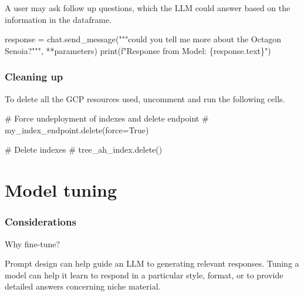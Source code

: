 \documentclass[
  letterpaper,
  DIV=11,
  numbers=noendperiod]{scrreprt}
\newenvironment{Shaded}{\begin{snugshade}}{\end{snugshade}}
\newcommand{\BuiltInTok}[1]{\textcolor[rgb]{0.00,0.23,0.31}{#1}}
\newcommand{\CommentTok}[1]{\textcolor[rgb]{0.37,0.37,0.37}{#1}}
\newcommand{\NormalTok}[1]{\textcolor[rgb]{0.00,0.23,0.31}{#1}}
\newcommand{\OperatorTok}[1]{\textcolor[rgb]{0.37,0.37,0.37}{#1}}
\newcommand{\SpecialCharTok}[1]{\textcolor[rgb]{0.37,0.37,0.37}{#1}}
\newcommand{\SpecialStringTok}[1]{\textcolor[rgb]{0.13,0.47,0.30}{#1}}
\newcommand{\StringTok}[1]{\textcolor[rgb]{0.13,0.47,0.30}{#1}}
\begin{document}
A user may ask follow up questions, which the LLM could answer based on
the information in the dataframe.

\begin{Shaded}
\begin{Highlighting}[]
\NormalTok{response }\OperatorTok{=}\NormalTok{ chat.send\_message(}\StringTok{"""could you tell me more about the Octagon Senoia?"""}\NormalTok{, }\OperatorTok{**}\NormalTok{parameters)}
\BuiltInTok{print}\NormalTok{(}\SpecialStringTok{f"Response from Model: }\SpecialCharTok{\{}\NormalTok{response}\SpecialCharTok{.}\NormalTok{text}\SpecialCharTok{\}}\SpecialStringTok{"}\NormalTok{)}
\end{Highlighting}
\end{Shaded}

\hypertarget{cleaning-up}{%
\subsection{Cleaning up}\label{cleaning-up}}

To delete all the GCP resources used, uncomment and run the following
cells.

\begin{Shaded}
\begin{Highlighting}[]
\CommentTok{\# Force undeployment of indexes and delete endpoint}
\CommentTok{\# my\_index\_endpoint.delete(force=True)}
\end{Highlighting}
\end{Shaded}

\begin{Shaded}
\begin{Highlighting}[]
\CommentTok{\# Delete indexes}
\CommentTok{\# tree\_ah\_index.delete()}
\end{Highlighting}
\end{Shaded}

\hypertarget{model-tuning}{%
\chapter{Model tuning}\label{model-tuning}}

\hypertarget{considerations}{%
\subsection{Considerations}\label{considerations}}

Why fine-tune?

Prompt design can help guide an LLM to generating relevant responses.
Tuning a model can help it learn to respond in a particular style,
format, or to provide detailed answers concerning niche material.
\end{document}
